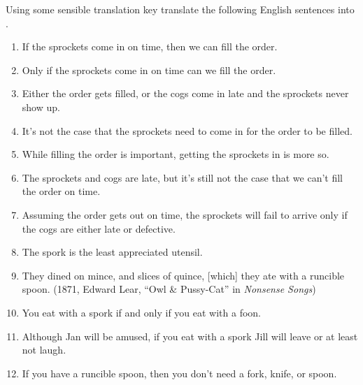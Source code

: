 Using some sensible translation key translate the following English sentences into \GSL{}. 
\begin{enumerate}
	\item If the sprockets come in on time, then we can fill the order.
	\item Only if the sprockets come in on time can we fill the order. 
	\item Either the order gets filled, or the cogs come in late and the sprockets never show up. 
	\item It's not the case that the sprockets need to come in for the order to be filled. 
	\item While filling the order is important, getting the sprockets in is more so. 
	\item The sprockets and cogs are late, but it's still not the case that we can't fill the order on time. 
	\item Assuming the order gets out on time, the sprockets will fail to arrive only if the cogs are either late or defective. 
	\item The spork is the least appreciated utensil. 
	\item They dined on mince, and slices of quince, [which] they ate with a runcible spoon. (1871, Edward Lear, “Owl \& Pussy-Cat” in \emph{Nonsense Songs})
	\item You eat with a spork if and only if you eat with a foon. 
	\item Although Jan will be amused, if you eat with a spork Jill will leave or at least not laugh.
	\item If you have a runcible spoon, then you don't need a fork, knife, or spoon. 
\end{enumerate}

